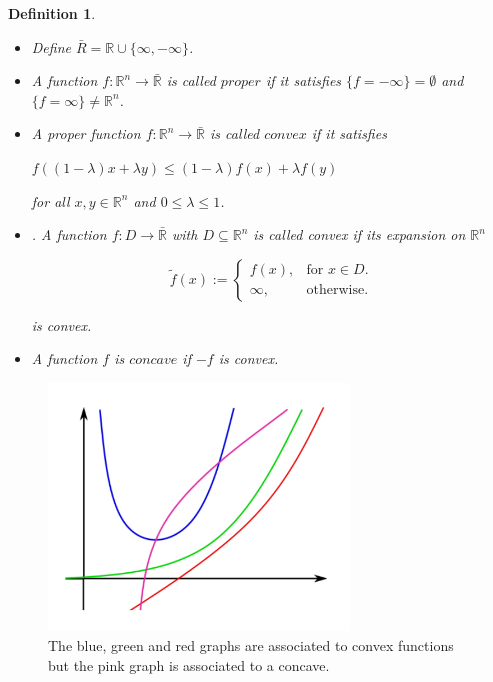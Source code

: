 \documentclass[a4paper]{book}
\newtheorem{definition}[theorem]{Definition}%
\numberwithin{theorem}{section}%
\begin{document}
\begin{definition}
	\begin{itemize}
		\item Define $\bar{R}=\mathbb{R}\cup\{ \infty,-\infty\}$.
		\item A function $f:\mathbb{R}^n\to\bar{\mathbb{R}}$ is called $proper$ if it satisfies $\{f=-\infty\}=\emptyset$ and $\{f=\infty\}\neq\mathbb{R}^n$.
		\item A proper function $f:\mathbb{R}^n\to\bar{\mathbb{R}}$ is called $convex$ if it satisfies 
		\begin{center}
			$\displaystyle f((1-\lambda)x+\lambda y)\leq(1-\lambda)f(x)+\lambda f(y)$
		\end{center}
		for all $x, y\in\mathbb{R}^n$ and $0\leq\lambda\leq1$.
		\item . A function $f:D\to\bar{\mathbb{R}}$ with $D\subseteq\mathbb{R}^n$ is called convex if its expansion on $\mathbb{R}^n$
		\begin{center}
			\begin{equation}
				  \tilde{f}(x):=\begin{cases}
				    	f(x), & \text{for $x\in D$}.\\
				   	 \infty, & \text{otherwise}.
				  \end{cases}
			\end{equation}
		\end{center}
		is convex.
		\item A function $f$ is $concave$ if $-f$ is convex.
	\end{itemize}
\end{definition}
\begin{figure}[h]
    \begin{center}   
        \includegraphics[width=80mm]{ConcaveFunction}
        \caption{The blue, green and red graphs are associated to convex functions but the pink graph is associated to a concave.}
    \end{center}
\end{figure}
\end{document}
